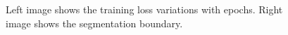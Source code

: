 \documentclass[a4paper]{article}
\begin{document}
\begin{figure}[thpb]
	\setlength{\fboxrule}{0.0pt}      
	\caption{Left image shows the training loss variations with epochs. Right image shows the segmentation boundary.}
\end{figure}
\end{document}
